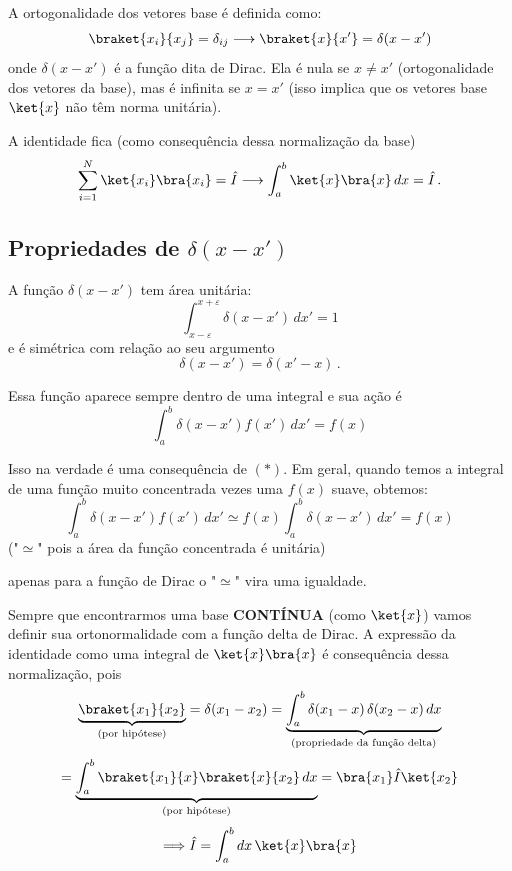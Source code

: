 A ortogonalidade dos vetores base é definida como:
\begin{equation}
    \braket{x_i}{x_j} = \delta_{ij} \longrightarrow \braket{x}{x'} = \delta(x - x')
\end{equation}
onde $\delta(x-x')$ é a função dita de Dirac. Ela é nula se $x \neq x'$ (ortogonalidade dos vetores da base), mas é infinita se $x = x'$ (isso implica que os vetores base $\ket{x}$ não têm norma unitária).

A identidade fica (como consequência dessa normalização da base)
\begin{equation}
    \sum_{i=1}^N \ket{x_i}\bra{x_i} = \hat{I} \longrightarrow \int_a^b \ket{x}\bra{x}\, dx = \hat{I} \, .
\end{equation}

\subsection*{Propriedades de $\delta(x-x')$}

A função $\delta(x-x')$ tem área unitária:
\begin{equation}
    \int_{x-\varepsilon}^{x+\varepsilon} \delta(x-x')\, dx' = 1 \tag{$*$}
\end{equation}
e é simétrica com relação ao seu argumento
\begin{equation}
    \delta(x-x') = \delta(x'-x) \, .
\end{equation}

Essa função aparece sempre dentro de uma integral e sua ação é
\begin{equation}
    \int_a^b \delta(x-x') f(x')\, dx' = f(x)
\end{equation}

Isso na verdade é uma consequência de $(*)$. Em geral, quando temos a integral de uma função muito concentrada vezes uma $f(x)$ suave, obtemos:
\begin{equation}
    \int_a^b \delta(x-x') f(x')\, dx' \simeq f(x) \int_a^b \delta(x-x')\, dx' = f(x)
\end{equation}
("$\simeq$" pois a área da função concentrada é unitária)

apenas para a função de Dirac o "$\simeq$" vira uma igualdade.

Sempre que encontrarmos uma base \textbf{CONTÍNUA} (como $\ket{x}$) vamos definir sua ortonormalidade com a função delta de Dirac. A expressão da identidade como uma integral de $\ket{x}\bra{x}$ é consequência dessa normalização, pois
\begin{equation}
    \underbrace{\braket{x_1}{x_2}}_{\text{(por hipótese)}} = \delta(x_1 - x_2) = \underbrace{\int_a^b \delta(x_1-x)\,\delta(x_2-x)\, dx}_{\text{(propriedade da função delta)}}
\end{equation}
\begin{equation}
    = \underbrace{\int_a^b \braket{x_1}{x}\braket{x}{x_2}\, dx}_{\text{(por hipótese)}} = \bra{x_1}\hat{I}\ket{x_2}
\end{equation}
\begin{equation}
    \Longrightarrow \hat{I} = \int_a^b dx\, \ket{x}\bra{x}
\end{equation}

